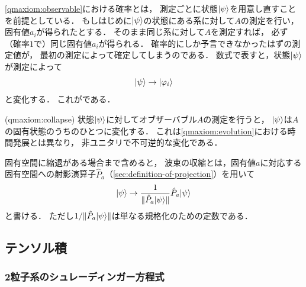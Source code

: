 \documentclass[
]{sotsu}
\begin{document}
\cref{qmaxiom:observable}における確率とは，
測定ごとに状態$\ket{\psi}$を用意し直すことを前提としている．
もしはじめに$\ket{\psi}$の状態にある系に対して$A$の測定を行い，
固有値$a_i$が得られたとする．
そのまま同じ系に対して$A$を測定すれば，
必ず（確率$1$で）同じ固有値$a_i$が得られる．
確率的にしか予言できなかったはずの測定値が，
最初の測定によって確定してしまうのである．
数式で表すと，状態$\ket{\psi}$が測定によって
\begin{equation*}
    \ket{\psi} \to \ket{\varphi_i}
\end{equation*}
と変化する．
これがである．


\begin{qmaxiom}[波束の収縮](qmaxiom:collapse)
    状態$\ket{\psi}$に対してオブザーバブル$A$の測定を行うと，
    $\ket{\psi}$は$\hat{A}$の固有状態のうちのひとつに変化する．
    これは\cref{qmaxiom:evolution}における時間発展とは異なり，
    非ユニタリで不可逆的な変化である．
\end{qmaxiom}


固有空間に縮退がある場合まで含めると，
波束の収縮とは，固有値$a$に対応する固有空間への射影演算子$\hat{P}_{a}$（\cref{sec:definition-of-projection}）を用いて
\begin{equation*}
    \ket{\psi} \to \frac{1}{\norm{\hat{P}_{a} \ket{\psi}}} \hat{P}_{a} \ket{\psi}
\end{equation*}
と書ける．
ただし\(
    1 / {\norm{\hat{P}_{a} \ket{\psi}}}
\)は単なる規格化のための定数である．



\subsection{テンソル積}
\label{sec:tensor-product}


\subsubsection{2粒子系のシュレーディンガー方程式}
\end{document}
